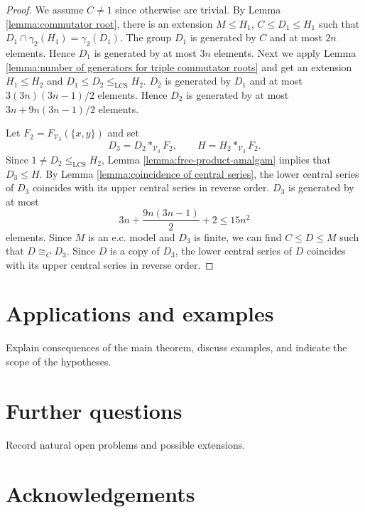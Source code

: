 \documentclass[11pt,reqno]{article}
\theoremstyle{definition}
\theoremstyle{remark}
\newcommand{\LCS}{\mathrm{LCS}}
\begin{document}
\begin{proof}
    We assume $C\neq 1$ since otherwise are trivial.
    By Lemma \ref{lemma:commutator root}, there is an
    extension $M\leq H_1$, $C\leq D_1\leq H_1$ such that 
    $D_1\cap\gamma_2(H_1)=\gamma_2(D_1)$.
    The group $D_1$ is generated by $C$ and at most $2n$ elements.  
    Hence $D_1$ is generated by at most $3n$ elements.
    Next we apply Lemma
    \ref{lemma:number of generators for triple commutator roots} and get an extension
    $H_1\leq H_2$ and $D_1\leq D_2\leq_\LCS H_2$.
    $D_2$ is generated by $D_1$ and at most $3(3n)(3n-1)/2$ elements.
    Hence $D_2$ is generated by at most $3n+9n(3n-1)/2$ elements.

    Let $F_2=F_{\mathcal V_3}(\{x,y\})$ and set
    \[
    D_3=D_2*_{\mathcal V_3}F_2,
    \qquad
    H=H_2*_{\mathcal V_3}F_2.
    \]
    Since $1\neq D_2\leq_{\LCS}H_2$, Lemma
    \ref{lemma:free-product-amalgam} implies that $D_3\leq H$.
    By Lemma \ref{lemma:coincidence of central series}, the lower central
    series of $D_3$ coincides with its upper central series in reverse order.
    $D_3$ is generated by at most
    \[
    3n+\frac{9n(3n-1)}2+2\leq 15n^2 
    \]
    elements.
    Since $M$ is an e.c. model and $D_3$ is finite, we can find $C\leq D\leq M$ such that $D\cong_C D_3$. 
    Since $D$ is a copy of $D_3$, the lower central series of $D$ coincides with its upper central series in reverse order.
\end{proof}





\section{Applications and examples}
\label{sec:applications}

Explain consequences of the main theorem, discuss examples, and indicate the
scope of the hypotheses.

\section{Further questions}
\label{sec:questions}

Record natural open problems and possible extensions.

\section*{Acknowledgements}
\end{document}
